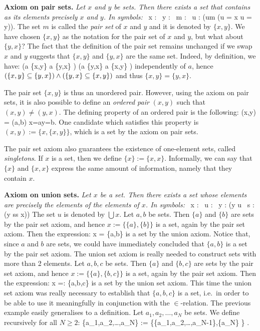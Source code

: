 \textbf{Axiom on pair sets.} \emph{Let $x$ and $y$ be sets. Then there exists a set that contains as its elements precisely $x$ and $y$. In symbols:}
\bse
\forall \, x : \forall \, y : \exists \, m : \forall \, u : (u\in m \eqv (u = x \lor u = y)).
\ese
The set $m$ is called the \emph{pair set} of $x$ and $y$ and it is denoted by $\{x,y\}$.
\br
We have chosen $\{x,y\}$ as the notation for the pair set of $x$ and $y$, but what about $\{y,x\}$?
The fact that the definition of the pair set remains unchanged if we swap $x$ and $y$ suggests that $\{x,y\}$ and $\{y,x\}$ are the same set.
Indeed, by definition, we have:
\bse
(a \in \{x,y\} \imp a \in \{y,x\} ) \land (a \in \{y,x\} \imp a \in \{x,y\} ) 
\ese
independently of $a$, hence $(\{x,y\} \subseteq \{y,x\}) \land (\{y,x\} \subseteq \{x,y\})$ and thus $\{x,y\} = \{y,x\}$.
\er

The pair set $\{x,y\}$ is thus an unordered pair. However, using the axiom on pair sets, it is also possible to define an \emph{ordered pair} $(x,y)$ such that $(x,y)\neq(y,x)$. The defining property of an ordered pair is the following:
\bse
(x,y) = (a,b) \eqv x=a\land y=b.
\ese
One candidate which satisfies this property is $(x,y):=\{x,\{x,y\}\}$, which is a set by the axiom on pair sets.

\br
The pair set axiom also guarantees the existence of one-element sets, called \emph{singletons}. 
If $x$ is a set, then we define $\{x\}:=\{x,x\}$. Informally, we can say that $\{x\}$ and $\{x,x\}$ express the same amount of information, namely that they contain $x$. 
\er

\textbf{Axiom on union sets.} \emph{Let $x$ be a set. Then there exists a set whose elements are precisely the elements of the elements of $x$. In symbols:}
\bse
\forall \, x : \exists \, u : \forall \, y : (y \in u \eqv \exists \, s :(y \in s\land s \in x))
\ese
The set $u$ is denoted by $\bigcup x$.
\be
Let $a,b$ be sets. Then $\{a\}$ and $\{b\}$ are sets by the pair set axiom, and hence $x:=\{\{a\},\{b\}\}$ is a set, again by the pair set axiom. Then the expression:
\bse
\bigcup x = \{a,b\}
\ese
is a set by the union axiom.
\ee
Notice that, since $a$ and $b$ are sets, we could have immediately concluded that $\{a,b\}$ is a set by the pair set axiom. The union set axiom is really needed to construct sets with more than 2 elements.
\be
Let $a,b,c$ be sets. Then $\{a\}$ and $\{b,c\}$ are sets by the pair set axiom, and hence $x:=\{\{a\},\{b,c\}\}$ is a set, again by the pair set axiom. Then the expression:
\bse
\bigcup x =: \{a,b,c\}
\ese
is a set by the union set axiom. This time the union set axiom was really necessary to establish that $\{a,b,c\}$ is a set, i.e.\ in order to be able to use it meaningfully in conjunction with the $\in$-relation.
\ee
The previous example easily generalises to a definition.
\bd
Let $a_1,a_2,\ldots,a_N$ be sets. We define recursively for all $N\geq 2$:
\bse
\{a_1,a_2,\ldots,a_{N}\} := \bigcup \left\{\{a_1,a_2,\ldots,a_{N-1}\},\{a_{N}\} \right\} .
\ese
\ed

